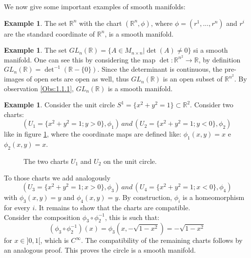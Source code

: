 \documentclass[12pt,a4paper]{report}
\theoremstyle{definition}
\theoremstyle{Theorem}
\theoremstyle{definition}
\newtheorem{Ex}[Def]{Example}
\theoremstyle{definition}
\begin{document}
	We now give some important examples of smooth manifolds:
	\begin{Ex}
		The set $\mathbb{R}^n$ with the chart $(\mathbb{R}^n,\phi)$, where $\phi=(r^1,...,r^n)$ and $r^i$ are the standard coordinate of $\mathbb{R}^n$, is a smooth manifold.
	\end{Ex}
	\begin{Ex}\label{Ex 1.1}
		The set $GL_n(\mathbb{R})=\{A\in M_{n\times n}|\det(A)\neq0\}$ si a smooth manifold. One can see this by considering the map $\det:\mathbb{R}^{n^2}\rightarrow \mathbb{R}$, by definition $GL_n(\mathbb{R})=\det^{-1}(\mathbb{R}-\{0\})$. Since the determinant is continuous, the pre-images of open sets are open as well, thus $GL_n(\mathbb{R})$ is an open subset of $\mathbb{R}^{n^2}$. By observation \ref{Obs:1.1.1}, $GL_n(\mathbb{R})$ is a smooth manifold.
	\end{Ex}
	\begin{Ex}
		Consider the unit circle $S^1=\{x^2+y^2=1\}\subset \mathbb{R}^2$. Consider two charts: $$(U_1=\{x^2+y^2=1;y>0\},\phi_1) \, and \,  (U_2=\{x^2+y^2=1;y<0\},\phi_2)$$ like in figure \ref{figura 1}, where the coordinate maps are defined like: $\phi_1(x,y)=x$ e $\phi_2(x,y)=x$.
		\begin{figure}[H]
			\centering
			\label{figura 1}
			\caption{The two charts $U_1$ and $U_2$ on the unit circle.}
		\end{figure}
		To those charts we add analogously $$(U_3=\{x^2+y^2=1;x>0\},\phi_3)\, and \, (U_4=\{x^2+y^2=1;x<0\},\phi_4)$$ with $\phi_3(x,y)=y$ and $\phi_4(x,y)=y$. By construction, $\phi_i$ is a homeomorphism for every $i$. It remains to show that the charts are compatible.\\
		Consider the composition $\phi_3\circ\phi_2^{-1}$, this is such that: $$(\phi_3\circ\phi_2^{-1})(x)=\phi_3(x,-\sqrt{1-x^2})=-\sqrt{1-x^2}$$ for $x\in ]0,1[$, which is $C^\infty$. The compatibility of the remaining charts follows by an analogous proof. This proves the circle is a smooth manifold.
	\end{Ex}
\end{document}
